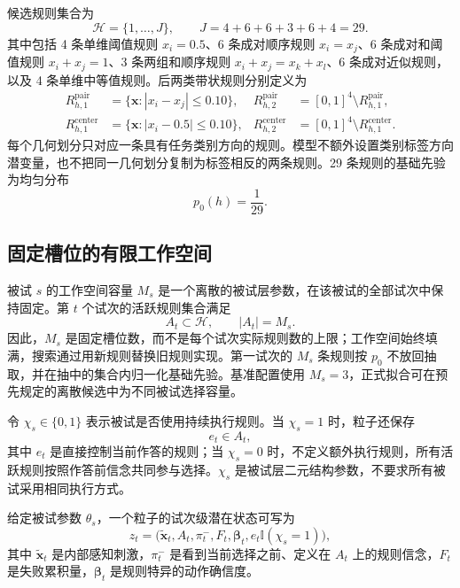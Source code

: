 \documentclass[12pt]{article}
\newcommand{\ind}{\mathbb I}
\begin{document}
候选规则集合为
\begin{equation}
\mathcal H=\{1,\ldots,J\},
\qquad
J=4+6+6+3+6+4=29.
\label{eq:rule-space}
\end{equation}
其中包括 4 条单维阈值规则 $x_i=0.5$、6 条成对顺序规则 $x_i=x_j$、6 条成对和阈值规则 $x_i+x_j=1$、3 条两组和顺序规则 $x_i+x_j=x_k+x_l$、6 条成对近似规则，以及 4 条单维中等值规则。后两类带状规则分别定义为
\begin{align}
R_{h,1}^{\mathrm{pair}}
&=\{\bm x:|x_i-x_j|\leq0.10\},
&
R_{h,2}^{\mathrm{pair}}
&=[0,1]^4\setminus R_{h,1}^{\mathrm{pair}},
\nonumber\\
R_{h,1}^{\mathrm{center}}
&=\{\bm x:|x_i-0.5|\leq0.10\},
&
R_{h,2}^{\mathrm{center}}
&=[0,1]^4\setminus R_{h,1}^{\mathrm{center}}.
\label{eq:band-rules}
\end{align}
每个几何划分只对应一条具有任务类别方向的规则。模型不额外设置类别标签方向潜变量，也不把同一几何划分复制为标签相反的两条规则。29 条规则的基础先验为均匀分布
\begin{equation}
p_0(h)=\frac{1}{29}.
\label{eq:base-prior}
\end{equation}

\subsection{固定槽位的有限工作空间}

被试 $s$ 的工作空间容量 $M_s$ 是一个离散的被试层参数，在该被试的全部试次中保持固定。第 $t$ 个试次的活跃规则集合满足
\begin{equation}
A_t\subset\mathcal H,
\qquad
|A_t|=M_s.
\label{eq:active-set}
\end{equation}
因此，$M_s$ 是固定槽位数，而不是每个试次实际规则数的上限；工作空间始终填满，搜索通过用新规则替换旧规则实现。第一试次的 $M_s$ 条规则按 $p_0$ 不放回抽取，并在抽中的集合内归一化基础先验。基准配置使用 $M_s=3$，正式拟合可在预先规定的离散候选中为不同被试选择容量。

令 $\chi_s\in\{0,1\}$ 表示被试是否使用持续执行规则。当 $\chi_s=1$ 时，粒子还保存
\begin{equation}
e_t\in A_t,
\label{eq:executed-rule}
\end{equation}
其中 $e_t$ 是直接控制当前作答的规则；当 $\chi_s=0$ 时，不定义额外执行规则，所有活跃规则按照作答前信念共同参与选择。$\chi_s$ 是被试层二元结构参数，不要求所有被试采用相同执行方式。

给定被试参数 $\theta_s$，一个粒子的试次级潜在状态可写为
\begin{equation}
z_t=
\bigl(
\widetilde{\bm x}_t,
A_t,
\pi_t^{-},
F_t,
\bm\beta_t,
e_t\ind(\chi_s=1)
\bigr),
\label{eq:latent-state}
\end{equation}
其中 $\widetilde{\bm x}_t$ 是内部感知刺激，$\pi_t^{-}$ 是看到当前选择之前、定义在 $A_t$ 上的规则信念，$F_t$ 是失败累积量，$\bm\beta_t$ 是规则特异的动作确信度。
\end{document}
